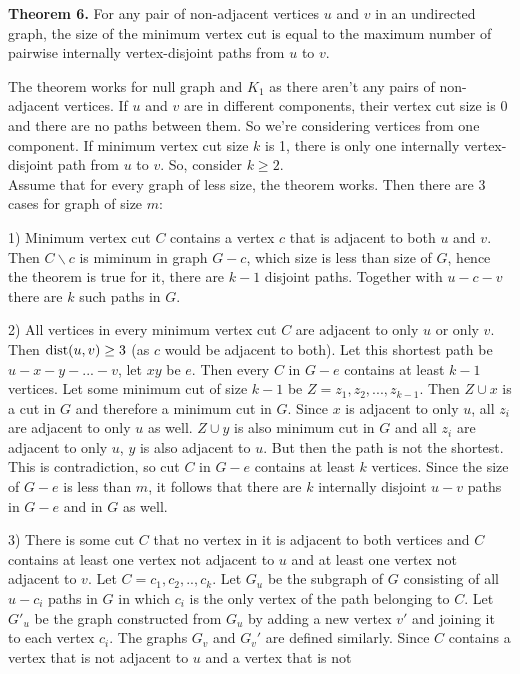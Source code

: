 \documentclass{article}
\begin{document}
	\textbf{Theorem 6.} For any pair of non-adjacent vertices $u$ and $v$ in an undirected graph, the size of the minimum vertex cut is equal to the maximum number of pairwise internally vertex-disjoint paths from $u$ to $v$.\par
	The theorem works for null graph and $K_1$ as there aren't any pairs of non-adjacent vertices. If $u$ and $v$ are in different components, their vertex cut size is 0 and there are no paths between them. So we're considering vertices from one component. If minimum vertex cut size $k$ is 1, there is only one internally vertex-disjoint path from $u$ to $v$. So, consider $k \geq 2$.\\
	Assume that for every graph of less size, the theorem works. Then there are 3 cases for graph of size $m$:\par
	1) Minimum vertex cut $C$ contains a vertex $c$ that is adjacent to both $u$ and $v$. Then $C \backslash c$ is miminum in graph $G - c$, which size is less than size of $G$, hence the theorem is true for it, there are $k - 1$ disjoint paths. Together with $u-c-v$ there are $k$ such paths in $G$.\par
	2) All vertices in every minimum vertex cut $C$ are adjacent to only $u$ or only $v$. Then $\textmd{dist}(u,v) \geq 3$ (as $c$ would be adjacent to both). Let this shortest path be $u - x - y -...-v$, let $xy$ be $e$. Then every $C$ in $G - e$ contains at least $k - 1$ vertices. Let some minimum cut of size $k - 1$ be $Z = {z_1,z_2,...,z_{k-1}}$. Then $Z \cup {x}$ is a cut in $G$ and therefore a minimum cut in $G$. Since $x$ is adjacent to only $u$, all $z_i$ are adjacent to only $u$ as well. $Z \cup {y}$ is also minimum cut in $G$ and all $z_i$ are adjacent to only $u$, $y$ is also adjacent to $u$. But then the path is not the shortest. This is contradiction, so cut $C$ in $G - e$ contains at least $k$ vertices.  Since the
	size of $G - e$ is less than $m$, it follows that there are $k$ internally disjoint $u-v$ paths in $G - e$ and in $G$ as well.\par 
	3) 	There is some cut $C$ that no vertex in it is adjacent to both vertices and $C$ contains at least one vertex not adjacent to $u$ and at least one vertex not adjacent to $v$. Let $C = {c_1,c_2,..,c_k}$. Let $G_u$ be the subgraph of $G$ consisting of all $u - c_i$ paths in $G$ in which $c_i$ is the only vertex of the
	path belonging to $C$. Let $G'_u$ be the graph constructed from $G_u$ by adding a
	new vertex $v'$ and joining it to each vertex $c_i$. The graphs $G_v$ and $G_v'$ are defined similarly. Since $C$ contains a vertex that is not adjacent to $u$ and a vertex that is not
\end{document}
